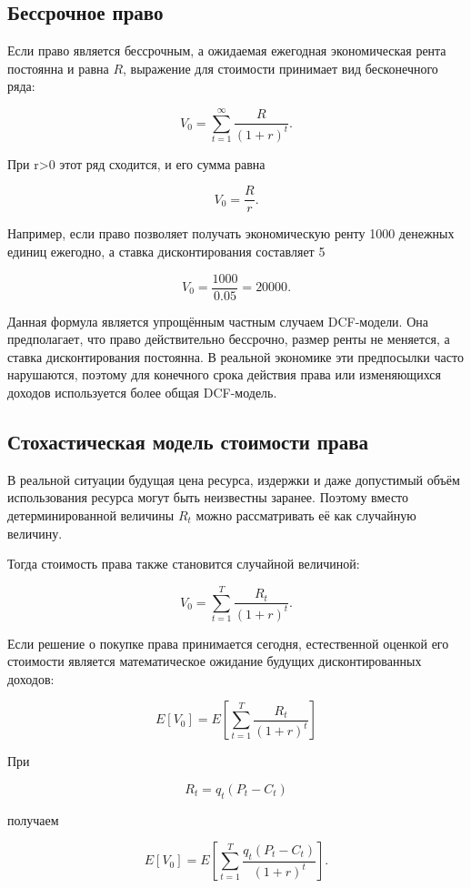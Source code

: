 \documentclass[12pt]{article}
\begin{document}
\subsection{Бессрочное право}

Если право является бессрочным, а ожидаемая ежегодная экономическая рента постоянна и равна $R$, выражение для стоимости принимает вид бесконечного ряда:

\[
V_0 =
\sum_{t=1}^{\infty}
\frac{R}{(1+r)^t}.
\]

При r>0 этот ряд сходится, и его сумма равна

\[
\boxed{V_0=\frac{R}{r}}.
\]

Например, если право позволяет получать экономическую ренту 1000 денежных единиц ежегодно, а ставка дисконтирования составляет 5%

\[
V_0=\frac{1000}{0.05}=20000.
\]

Данная формула является упрощённым частным случаем DCF-модели. Она предполагает, что право действительно бессрочно, размер ренты не меняется, а ставка дисконтирования постоянна. В реальной экономике эти предпосылки часто нарушаются, поэтому для конечного срока действия права или изменяющихся доходов используется более общая DCF-модель.

\subsection{Стохастическая модель стоимости права}

В реальной ситуации будущая цена ресурса, издержки и даже допустимый объём использования ресурса могут быть неизвестны заранее. Поэтому вместо детерминированной величины $R_t$ можно рассматривать её как случайную величину.

Тогда стоимость права также становится случайной величиной:

\[
V_0 =
\sum_{t=1}^{T}
\frac{R_t}{(1+r)^t}.
\]

Если решение о покупке права принимается сегодня, естественной оценкой его стоимости является математическое ожидание будущих дисконтированных доходов:

\[
  \boxed{
    E[V_0] = E\left[ \sum_{t=1}^{T} \frac{R_t}{(1+r)^t} \right]
  }
\]


При

\[
R_t=q_t(P_t-C_t)
\]

получаем

\[
E[V_0] = E\left[
\sum_{t=1}^{T}
\frac{q_t(P_t-C_t)}{(1+r)^t}
\right].
\]
\end{document}
